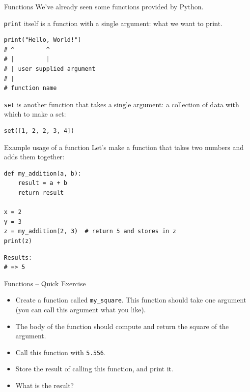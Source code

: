 \documentclass[10pt]{beamer}
\begin{document}
\begin{frame}[label={sec:org935c0dd},fragile]{Functions}
 We've already seen some functions provided by Python.

\texttt{print} itself is a function with a single argument: what we want to print.

\begin{verbatim}
print("Hello, World!")
# ^         ^
# |         |
# | user supplied argument
# |
# function name 
\end{verbatim}

\texttt{set} is another function that takes a single argument: a collection of data with which
to make a set:

\begin{verbatim}
set([1, 2, 2, 3, 4])
\end{verbatim}
\end{frame}

\begin{frame}[label={sec:orgacebc60},fragile]{Example usage of a function}
 Let's make a function that takes two numbers and adds them together:

\begin{verbatim}
def my_addition(a, b):
    result = a + b
    return result

x = 2
y = 3
z = my_addition(2, 3)  # return 5 and stores in z
print(z)
\end{verbatim}

\begin{verbatim}
Results: 
# => 5
\end{verbatim}
\end{frame}

\begin{frame}[label={sec:org36765c7},fragile]{Functions -- Quick Exercise}
 \begin{itemize}
\item Create a function called \texttt{my\_square}. This function should take one argument (you can
call this argument what you like).
\item The body of the function should compute and return the square of the argument.
\item Call this function with \texttt{5.556}.
\item Store the result of calling this function, and print it.
\item What is the result?
\end{itemize}
\end{frame}
\end{document}
